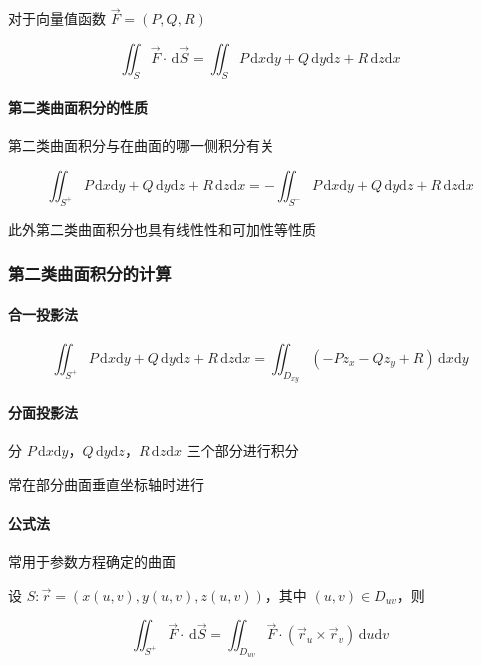 \documentclass[lang = zh , final , oneside , openany , titlepage , zihao = -4 , linespread = 1.3 , baselineskip = false , cjk-font = windows , text-font = newtx , math-font = newtx]{sjtureport}
\begin{document}
对于向量值函数 \(\vec{F} = (P,Q,R)\)

\[
\iint_S \vec{F}\cdot\,\mathrm{d}\vec{S} = \iint_S P\,\mathrm{d}x\mathrm{d}y + Q\,\mathrm{d}y\mathrm{d}z + R\,\mathrm{d}z\mathrm{d}x
\]

\paragraph{第二类曲面积分的性质}

第二类曲面积分与在曲面的哪一侧积分有关

\[
\iint_{S^+}P\,\mathrm{d}x\mathrm{d}y + Q\,\mathrm{d}y\mathrm{d}z + R\,\mathrm{d}z\mathrm{d}x = -\iint_{S^-}P\,\mathrm{d}x\mathrm{d}y + Q\,\mathrm{d}y\mathrm{d}z + R\,\mathrm{d}z\mathrm{d}x
\]

此外第二类曲面积分也具有线性性和可加性等性质

\subsubsection{第二类曲面积分的计算}

\paragraph{合一投影法}

\[
\iint_{S^+}P\,\mathrm{d}x\mathrm{d}y + Q\,\mathrm{d}y\mathrm{d}z + R\,\mathrm{d}z\mathrm{d}x = \iint_{D_{xy}} \left(-Pz_x - Qz_y + R\right)\,\mathrm{d}x\mathrm{d}y
\]

\paragraph{分面投影法}

分 \(P\,\mathrm{d}x\mathrm{d}y\)，\(Q\,\mathrm{d}y\mathrm{d}z\)，\(R\,\mathrm{d}z\mathrm{d}x\) 三个部分进行积分

常在部分曲面垂直坐标轴时进行

\paragraph{公式法}

常用于参数方程确定的曲面

设 \(S:\vec{r} = \left(x(u,v),y(u,v),z(u,v)\right)\)，其中 \((u,v)\in D_{uv}\)，则

\[
\iint_{S^+}\vec{F}\cdot\,\mathrm{d}\vec{S} = \iint_{D_{uv}}\vec{F}\cdot\left(\vec{r}_u\times\vec{r}_v\right)\,\mathrm{d}u\mathrm{d}v
\]
\end{document}
